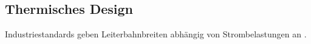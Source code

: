 \documentclass[10pt,a4paper,oneside,abstracton]{scrartcl}
\newenvironment{Figure}
  {\par\medskip\noindent\minipage{\linewidth}}
  {\endminipage\par\medskip}
\begin{document}
\begin{multicols}{2}



\section{Thermisches Design}
Industriestandards geben Leiterbahnbreiten abhängig von Strombelastungen an \cite{ipc}.
\newline

\end{multicols}
\end{document}
